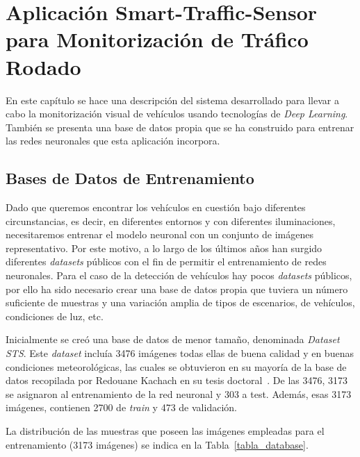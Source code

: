 \chapter{Aplicación Smart-Traffic-Sensor para Monitorización de Tráfico Rodado}\label{cap.diseno}

En este capítulo se hace una descripción del sistema desarrollado para llevar a cabo la monitorización visual de vehículos usando tecnologías de \textit{Deep Learning}. También se presenta una base de datos propia que se ha construido para entrenar las redes neuronales que esta aplicación incorpora.

\section{Bases de Datos de Entrenamiento}\label{sec.base_datos}

Dado que queremos encontrar los vehículos en cuestión bajo diferentes circunstancias, es decir, en diferentes entornos y con diferentes iluminaciones, necesitaremos entrenar el modelo neuronal con un conjunto de imágenes representativo. Por este motivo, a lo largo de los últimos años han surgido diferentes \textit{datasets} públicos con el fin de permitir el entrenamiento de redes neuronales. Para el caso de la detección de vehículos hay pocos \textit{datasets} públicos, por ello ha sido necesario crear una base de datos propia que tuviera un número suficiente de muestras y una variación amplia de tipos de escenarios, de vehículos, condiciones de luz, etc.

Inicialmente se creó una base de datos de menor tamaño, denominada \textit{Dataset STS}. Este \textit{dataset} incluía 3476 imágenes todas ellas de buena calidad y en buenas condiciones meteorológicas, las cuales se obtuvieron en su mayoría de la base de datos recopilada por Redouane Kachach en su tesis doctoral~\cite{traffic_monitor_lab}. De las 3476, 3173 se asignaron al entrenamiento de la red neuronal y 303 a test. Además, esas 3173 imágenes, contienen 2700 de \textit{train} y 473 de validación.

La distribución de las muestras que poseen las imágenes empleadas para el entrenamiento (3173 imágenes) se indica en la Tabla~\ref{tabla_database}.

